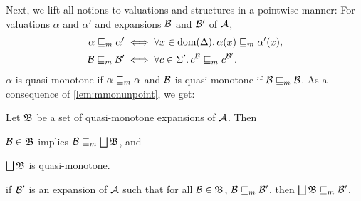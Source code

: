 \documentclass[a4paper,twoside,notitlepage,openright,11pt]{report}
\begin{document}
Next, we lift all notions to valuations and structures in a pointwise manner: For valuations $\alpha$ and $\alpha'$ and expansions $\mathcal B$ and $\mathcal B'$ of $\mathcal A$,
\begin{align*}
  \alpha\sqsubseteq_m\alpha'&\iff\forall x\in\operatorname{dom}(\Delta)\ldotp\alpha(x)\sqsubseteq_m\alpha'(x),\\
  \mathcal B\sqsubseteq_m\mathcal B'&\iff\forall c\in\Sigma'\ldotp c^\mathcal B\sqsubseteq_m c^{\mathcal B'}.
\end{align*}
$\alpha$ is quasi-monotone if $\alpha\sqsubseteq_m\alpha$ and $\mathcal B$ is quasi-monotone if $\mathcal B\sqsubseteq_m\mathcal B$. As a consequence of \cref{lem:mmonunpoint}, we get:
\begin{corollary}
  Let $\mathfrak B$ be a set of quasi-monotone expansions of $\mathcal A$. Then
  \begin{thmlist}
  \item \label{cor:unionmon} $\mathcal B\in\mathfrak B$ implies $\mathcal B\sqsubseteq_m\bigsqcup\mathfrak B$, and 
  \item \label{cor:unionsmaller} $\bigsqcup\mathfrak B$ is quasi-monotone.
  \item \label{cor:unionlub}if $\mathcal B'$ is an expansion of $\mathcal A$ such that for all $\mathcal B\in\mathfrak B$, $\mathcal B\sqsubseteq_m\mathcal B'$, then $\bigsqcup\mathfrak B\sqsubseteq_m\mathcal B'$.
  \end{thmlist}
\end{corollary}
\end{document}
